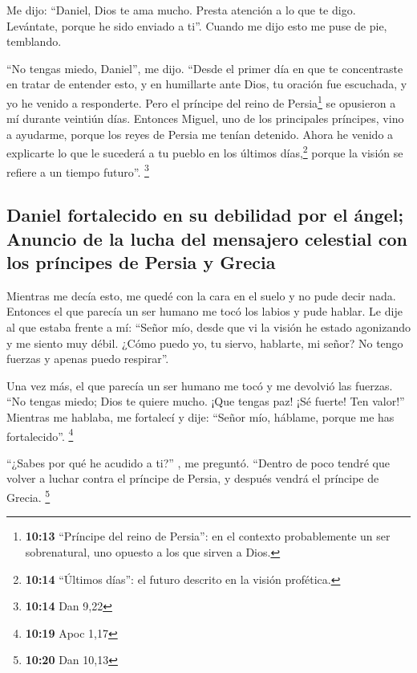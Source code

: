  Me dijo: ``Daniel, Dios te ama mucho. Presta atención a
lo que te digo. Levántate, porque he sido enviado a ti''. Cuando me dijo
esto me puse de pie, temblando.

 ``No tengas miedo, Daniel'', me dijo. ``Desde el primer
día en que te concentraste en tratar de entender esto, y en humillarte
ante Dios, tu oración fue escuchada, y yo he venido a responderte.
 Pero el príncipe del reino de Persia\footnote{\textbf{10:13}
  ``Príncipe del reino de Persia'': en el contexto probablemente un ser
  sobrenatural, uno opuesto a los que sirven a Dios.} se opusieron a mí
durante veintiún días. Entonces Miguel, uno de los principales
príncipes, vino a ayudarme, porque los reyes de Persia me tenían
detenido.  Ahora he venido a explicarte lo que le
sucederá a tu pueblo en los últimos días,\footnote{\textbf{10:14}
  ``Últimos días'': el futuro descrito en la visión profética.} porque
la visión se refiere a un tiempo futuro''. \footnote{\textbf{10:14} Dan
  9,22}

\hypertarget{daniel-fortalecido-en-su-debilidad-por-el-uxe1ngel-anuncio-de-la-lucha-del-mensajero-celestial-con-los-pruxedncipes-de-persia-y-grecia}{%
\subsection{Daniel fortalecido en su debilidad por el ángel; Anuncio de
la lucha del mensajero celestial con los príncipes de Persia y
Grecia}\label{daniel-fortalecido-en-su-debilidad-por-el-uxe1ngel-anuncio-de-la-lucha-del-mensajero-celestial-con-los-pruxedncipes-de-persia-y-grecia}}

 Mientras me decía esto, me quedé con la cara en el suelo
y no pude decir nada.  Entonces el que parecía un ser
humano me tocó los labios y pude hablar. Le dije al que estaba frente a
mí: ``Señor mío, desde que vi la visión he estado agonizando y me siento
muy débil.  ¿Cómo puedo yo, tu siervo, hablarte, mi
señor? No tengo fuerzas y apenas puedo respirar''.

 Una vez más, el que parecía un ser humano me tocó y me
devolvió las fuerzas.  ``No tengas miedo; Dios te quiere
mucho. ¡Que tengas paz! ¡Sé fuerte! Ten valor!'' Mientras me hablaba, me
fortalecí y dije: ``Señor mío, háblame, porque me has fortalecido''.
\footnote{\textbf{10:19} Apoc 1,17}

 ``¿Sabes por qué he acudido a ti?'' , me preguntó.
``Dentro de poco tendré que volver a luchar contra el príncipe de
Persia, y después vendrá el príncipe de Grecia. \footnote{\textbf{10:20}
  Dan 10,13}


